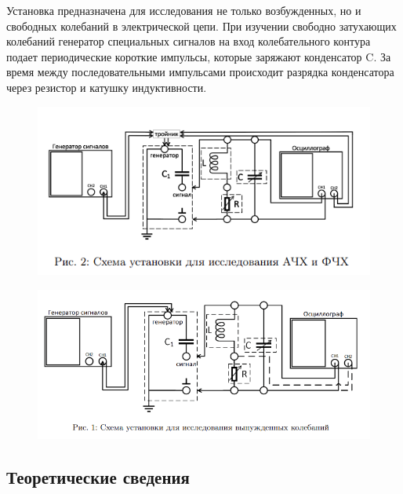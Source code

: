 \documentclass[a4paper, 12pt]{article}
\begin{document}
            Установка предназначена для исследования не только возбужденных, но и свободных колебаний в электрической цепи. При изучении свободно затухающих колебаний генератор специальных сигналов на вход колебательного контура подает периодические короткие импульсы, которые заряжают конденсатор C. За время между последовательными импульсами происходит разрядка конденсатора через резистор и катушку индуктивности.
            \begin{figure}[H]
                \centering
                \includegraphics{img/2.png}
            \end{figure}
            \begin{figure}[H]
                \centering
                \includegraphics{img/1.png}
            \end{figure}

        \subsection*{Теоретические сведения}
\end{document}
